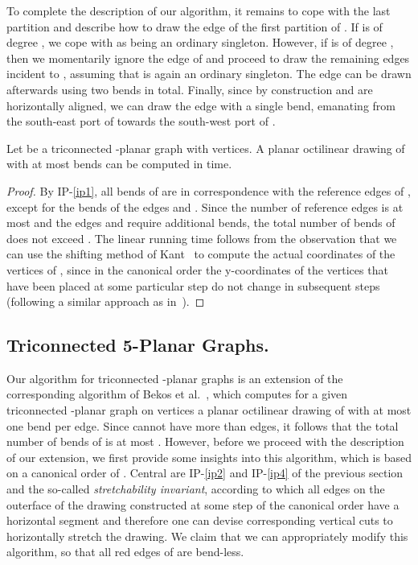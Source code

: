 \documentclass[a4paper,twoside,11pt]{article}
\begin{document}
To complete the description of our algorithm, it remains to cope
with the last partition  and describe how to draw the
edge  of the first partition  of . If  is
of degree , we cope with  as being an ordinary singleton.
However, if  is of degree , then we momentarily ignore the
edge  of  and proceed to draw the remaining edges
incident to , assuming that  is again an ordinary
singleton. The edge  can be drawn afterwards using two
bends in total. Finally, since by construction  and  are
horizontally aligned, we can draw the edge  with a single
bend, emanating from the south-east port of  towards the
south-west port of .

\begin{theorem}
Let  be a triconnected -planar graph with  vertices. A
planar octilinear drawing  of  with at most 
bends can be computed in  time.
\label{thm:4ub}
\end{theorem}
\begin{proof}
By IP-\ref{ip1}, all bends of  are in correspondence with
the reference edges of , except for the bends of the edges
 and . Since the number of reference edges is
at most  and the edges  and  require 
additional bends, the total number of bends of  does not
exceed . The linear running time follows from the observation
that we can use the shifting method of Kant~\cite{Kant92} to compute
the actual coordinates of the vertices of , since in the
canonical order the y-coordinates of the vertices that have been
placed at some particular step do not change in subsequent steps
(following a similar approach as in~\cite{BGKK14}).
\end{proof}

\subsection{Triconnected 5-Planar Graphs.}
\label{sec:5planar}


Our algorithm for triconnected -planar graphs is an extension of
the corresponding algorithm of Bekos et al.~\cite{BGKK14}, which
computes for a given triconnected -planar graph  on 
vertices a planar octilinear drawing  of  with at most
one bend per edge. Since  cannot have more than  edges, it
follows that the total number of bends of  is at most
. However, before we proceed with the description of our
extension, we first provide some insights into this algorithm, which
is based on a canonical order  of .
Central are IP-\ref{ip2} and IP-\ref{ip4} of the previous section and
the so-called \emph{stretchability invariant}, according to which all
edges on the outerface of the drawing constructed at some step of the
canonical order have a horizontal segment and therefore one can
devise corresponding vertical cuts to horizontally stretch the
drawing. We claim that we can appropriately modify this algorithm, so
that all red edges of  are bend-less.
\end{document}
